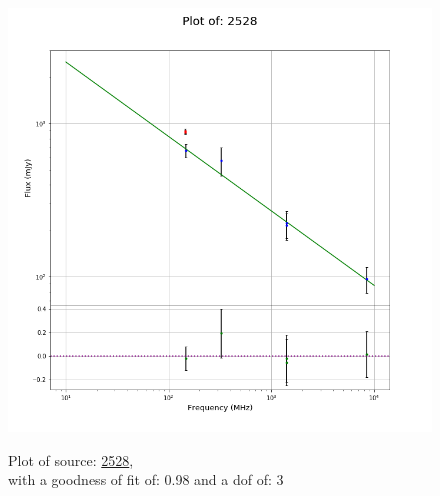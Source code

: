 \documentclass{article}
\begin{document}
\begin{figure}[H]
\begin{minipage}{0.5\textwidth}
        \includegraphics[scale = 0.35]{KmeulenTrap4P23_1hr/1hr2528.png}
        \captionsetup{labelformat=empty}
        \caption{Plot of source: \href{http://banana.transientskp.org/r4/vlo_KmeulenTrap4P23/runningcatalog/2528}{2528},\\with a goodness of fit of: 0.98 and a dof of: 3}
    \addtocounter{figure}{-1}
    \label{KmeulenTrap4P23:1hr:2528:plot}
    \end{minipage}
\end{figure}
\end{document}
